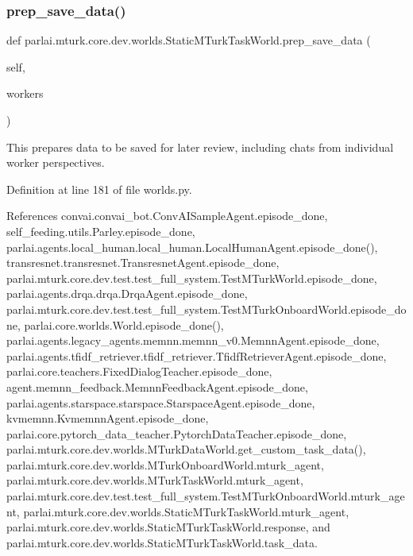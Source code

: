 \subsubsection{\texorpdfstring{prep\+\_\+save\+\_\+data()}{prep\_save\_data()}}
{\footnotesize\ttfamily def parlai.\+mturk.\+core.\+dev.\+worlds.\+Static\+M\+Turk\+Task\+World.\+prep\+\_\+save\+\_\+data (\begin{DoxyParamCaption}\item[{}]{self,  }\item[{}]{workers }\end{DoxyParamCaption})}

\begin{DoxyVerb}This prepares data to be saved for later review, including
chats from individual worker perspectives.\end{DoxyVerb}
 

Definition at line 181 of file worlds.\+py.



References convai.\+convai\+\_\+bot.\+Conv\+A\+I\+Sample\+Agent.\+episode\+\_\+done, self\+\_\+feeding.\+utils.\+Parley.\+episode\+\_\+done, parlai.\+agents.\+local\+\_\+human.\+local\+\_\+human.\+Local\+Human\+Agent.\+episode\+\_\+done(), transresnet.\+transresnet.\+Transresnet\+Agent.\+episode\+\_\+done, parlai.\+mturk.\+core.\+dev.\+test.\+test\+\_\+full\+\_\+system.\+Test\+M\+Turk\+World.\+episode\+\_\+done, parlai.\+agents.\+drqa.\+drqa.\+Drqa\+Agent.\+episode\+\_\+done, parlai.\+mturk.\+core.\+dev.\+test.\+test\+\_\+full\+\_\+system.\+Test\+M\+Turk\+Onboard\+World.\+episode\+\_\+done, parlai.\+core.\+worlds.\+World.\+episode\+\_\+done(), parlai.\+agents.\+legacy\+\_\+agents.\+memnn.\+memnn\+\_\+v0.\+Memnn\+Agent.\+episode\+\_\+done, parlai.\+agents.\+tfidf\+\_\+retriever.\+tfidf\+\_\+retriever.\+Tfidf\+Retriever\+Agent.\+episode\+\_\+done, parlai.\+core.\+teachers.\+Fixed\+Dialog\+Teacher.\+episode\+\_\+done, agent.\+memnn\+\_\+feedback.\+Memnn\+Feedback\+Agent.\+episode\+\_\+done, parlai.\+agents.\+starspace.\+starspace.\+Starspace\+Agent.\+episode\+\_\+done, kvmemnn.\+Kvmemnn\+Agent.\+episode\+\_\+done, parlai.\+core.\+pytorch\+\_\+data\+\_\+teacher.\+Pytorch\+Data\+Teacher.\+episode\+\_\+done, parlai.\+mturk.\+core.\+dev.\+worlds.\+M\+Turk\+Data\+World.\+get\+\_\+custom\+\_\+task\+\_\+data(), parlai.\+mturk.\+core.\+dev.\+worlds.\+M\+Turk\+Onboard\+World.\+mturk\+\_\+agent, parlai.\+mturk.\+core.\+dev.\+worlds.\+M\+Turk\+Task\+World.\+mturk\+\_\+agent, parlai.\+mturk.\+core.\+dev.\+test.\+test\+\_\+full\+\_\+system.\+Test\+M\+Turk\+Onboard\+World.\+mturk\+\_\+agent, parlai.\+mturk.\+core.\+dev.\+worlds.\+Static\+M\+Turk\+Task\+World.\+mturk\+\_\+agent, parlai.\+mturk.\+core.\+dev.\+worlds.\+Static\+M\+Turk\+Task\+World.\+response, and parlai.\+mturk.\+core.\+dev.\+worlds.\+Static\+M\+Turk\+Task\+World.\+task\+\_\+data.

